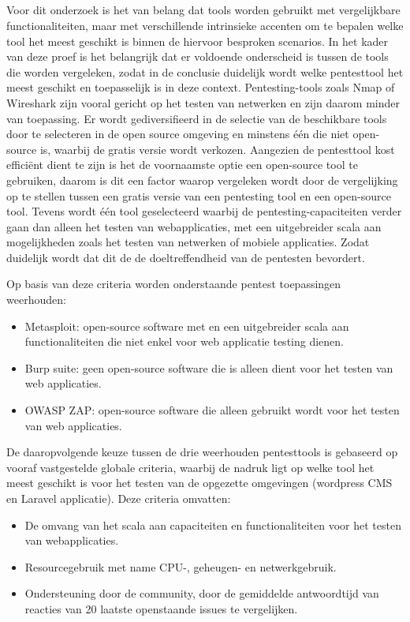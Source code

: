 \subsection{}
Voor dit onderzoek is het van 
belang dat tools worden gebruikt met vergelijkbare functionaliteiten, maar met verschillende intrinsieke accenten om te bepalen welke 
tool het meest geschikt is binnen de hiervoor besproken scenarios. In het kader van deze proef is het belangrijk dat er voldoende onderscheid is tussen de tools 
die worden vergeleken, zodat in de conclusie duidelijk wordt welke pentesttool het meest geschikt en toepasselijk is in deze context. 
Pentesting-tools zoals Nmap of Wireshark zijn vooral gericht op het testen van netwerken en  zijn daarom minder van toepassing. Er wordt
gediversifieerd in de selectie van de beschikbare tools door te selecteren in de open source omgeving en minstens één die niet open-source is, waarbij de gratis versie wordt 
verkozen. Aangezien de pentesttool kost efficiënt dient te zijn is het de voornaamste optie een open-source tool te gebruiken, daarom 
is dit een factor waarop vergeleken wordt door de vergelijking op te stellen tussen een gratis versie van een pentesting tool en een open-source tool. 
Tevens wordt één tool geselecteerd waarbij de pentesting-capaciteiten verder gaan dan alleen het testen van webapplicaties, met een 
uitgebreider scala aan mogelijkheden zoals het testen van netwerken of mobiele applicaties. Zodat duidelijk wordt dat dit de
de doeltreffendheid van de pentesten bevordert.

Op basis van deze criteria worden onderstaande pentest toepassingen weerhouden:
\begin{itemize}
    \item Metasploit: open-source software met en een uitgebreider scala aan functionaliteiten die niet enkel voor web applicatie testing dienen.
    \item Burp suite: geen open-source software die is alleen dient voor het testen van web applicaties.
    \item OWASP ZAP: open-source software die alleen gebruikt wordt voor het testen van web applicaties.
\end{itemize}


De daaropvolgende keuze tussen de drie weerhouden pentesttools is gebaseerd op vooraf vastgestelde globale criteria, waarbij de nadruk ligt op welke tool het meest 
geschikt is voor het testen van de opgezette omgevingen (wordpress CMS en Laravel applicatie). Deze criteria omvatten:
\begin{itemize}
    \item De omvang van het scala aan capaciteiten en functionaliteiten voor het testen van webapplicaties.
    \item Resourcegebruik met name CPU-, geheugen- en netwerkgebruik.
    \item Ondersteuning door de community, door de gemiddelde antwoordtijd van reacties van 20 laatste openstaande issues te vergelijken.
\end{itemize}

